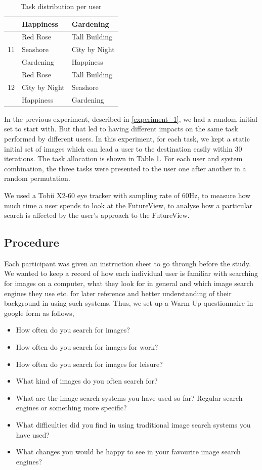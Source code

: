 \documentclass[english]{tktltiki}
\begin{document}
\begin{table}[h]
\begin{tabular}{ |l|l|l| }
 			& Happiness & Gardening \\
 		\hline
 		\multirow{3}{*}{11} & Red Rose & Tall Building \\
 			& Seashore & City by Night \\
 			& Gardening & Happiness \\
 		\hline
 		\multirow{3}{*}{12} & Red Rose & Tall Building \\
 			& City by Night & Seashore \\
 			& Happiness & Gardening \\
 		\hline
	\end{tabular}
	\caption{Task distribution per user}
    \label{table:table_task_allocation}
\end{table}


In the previous experiment, described in \ref{experiment_1}, we had a random initial set to start with. But that led to having different impacts on the same task performed by different users. In this experiment, for each task, we kept a static initial set of images which can lead a user to the destination easily within $30$ iterations. The task allocation is shown in Table \ref{table:table_task_allocation}. For each user and system combination, the three tasks were presented to the user one after another in a random permutation.

We used a Tobii X2-60 eye tracker with sampling rate of 60Hz, to measure how much time a user spends to look at the FutureView, to analyse how a particular search is affected by the user's approach to the FutureView.


\subsection{Procedure}


Each participant was given an instruction sheet to go through before the study. We wanted to keep a record of how each individual user is familiar with searching for images on a computer, what they look for in general and which image search engines they use etc. for later reference and better understanding of their background in using such systems. Thus, we set up a Warm Up questionnaire in google form as follows,

\begin{itemize}
	\item How often do you search for images?
	\item How often do you search for images for work?
	\item How often do you search for images for leisure?
	\item What kind of images do you often search for?
	\item What are the image search systems you have used so far? Regular search engines or something more specific?
	\item What difficulties did you find in using traditional image search systems you have used?
	\item What changes you would be happy to see in your favourite image search engines?
\end{itemize}
\end{document}
